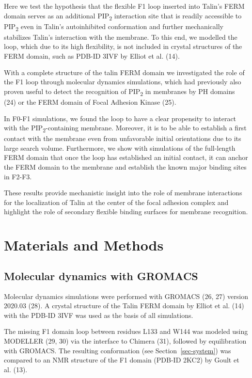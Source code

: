 \documentclass[
  letterpaper,
  DIV=11,
  numbers=noendperiod]{scrartcl}
\begin{document}
Here we test the hypothesis that the flexible F1 loop inserted into
Talin's FERM domain serves as an additional PIP\textsubscript{2}
interaction site that is readily accessible to PIP\textsubscript{2} even
in Talin's autoinhibited conformation and further mechanically
stabilizes Talin's interaction with the membrane. To this end, we
modelled the loop, which due to its high flexibility, is not included in
crystal structures of the FERM domain, such as PDB-ID 3IVF by Elliot et
al. (14).

With a complete structure of the talin FERM domain we investigated the
role of the F1 loop through molecular dynamics simulations, which had
previously also proven useful to detect the recognition of
PIP\textsubscript{2} in membranes by PH domains (24) or the FERM domain
of Focal Adhesion Kinase (25).

In F0-F1 simulations, we found the loop to have a clear propensity to
interact with the PIP\textsubscript{2}-containing membrane. Moreover, it
is to be able to establish a first contact with the membrane even from
unfavorable initial orientations due to its large search volume.
Furthermore, we show with simulations of the full-length FERM domain
that once the loop has established an initial contact, it can anchor the
FERM domain to the membrane and establish the known major binding sites
in F2-F3.

These results provide mechanistic insight into the role of membrane
interactions for the localization of Talin at the center of the focal
adhesion complex and highlight the role of secondary flexible binding
surfaces for membrane recognition.

\hypertarget{materials-and-methods}{%
\section{Materials and Methods}\label{materials-and-methods}}

\hypertarget{molecular-dynamics-with-gromacs}{%
\subsection{Molecular dynamics with
GROMACS}\label{molecular-dynamics-with-gromacs}}

Molecular dynamics simulations were performed with GROMACS (26, 27)
version 2020.03 (28). A crystal structure of the Talin FERM domain by
Elliot et al. (14) with the PDB-ID 3IVF was used as the basis of all
simulations.

The missing F1 domain loop between residues L133 and W144 was modeled
using MODELLER (29, 30) via the interface to Chimera (31), followed by
equilibration with GROMACS. The resulting conformation (see
Section~\ref{sec-system}) was compared to an NMR structure of the F1
domain (PDB-ID 2KC2) by Goult et al. (13).
\end{document}
